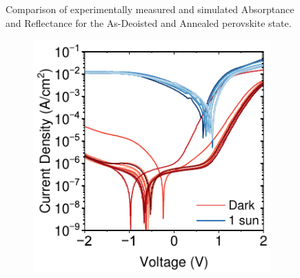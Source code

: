 \begin{figure}[htbp]
    \caption{Comparison of experimentally measured and simulated Absorptance and Reflectance for the As-Deoisted and Annealed perovskite state.}
    \label{fig:ch2:eqe}
\end{figure}



\begin{figure}[htbp]
    \centering
    \begin{subfigure}[t]{0.45\textwidth}
        \centering
        \includegraphics[width=\textwidth]{chapters/material_properties/images/High_yield_discrete.pdf} 
        \caption{}
        \label{fig:ch2:high_yield_discrete}
    \end{subfigure}
    \hfill
    \begin{subfigure}[t]{0.45\textwidth}
        \centering

\end{subfigure}
\end{figure}

